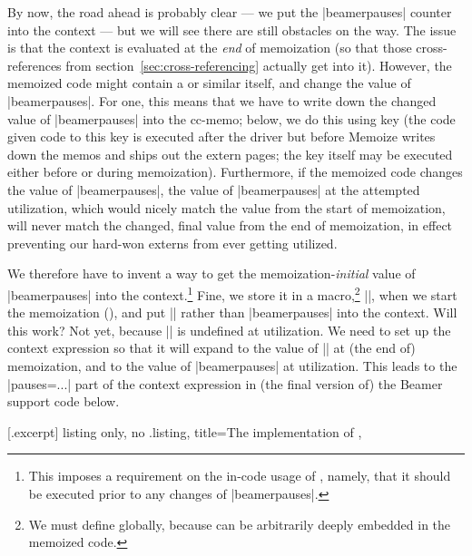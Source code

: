 \documentclass[a4paper,11pt]{article}
\begin{document}
By now, the road ahead is probably clear --- we put the |beamerpauses| counter
into the context --- but we will see there are still obstacles on the way.  The
issue is that the context is evaluated at the \emph{end} of memoization (so
that those cross-references from section~\ref{sec:cross-referencing} actually
get into it).  However, the memoized code might contain a  or similar
itself, and change the value of |beamerpauses|.  For one, this means that we
have to write down the changed value of |beamerpauses| into the cc-memo; below,
we do this using key  (the code given code to this
key is executed after the driver but before Memoize writes down the memos and
ships out the extern pages; the key itself may be executed either before or
during memoization).  Furthermore, if the memoized code changes the value of
|beamerpauses|, the value of |beamerpauses| at the attempted utilization, which
would nicely match the value from the start of memoization, will never match
the changed, final value from the end of memoization, in effect preventing our
hard-won externs from ever getting utilized.

We therefore have to invent a way to get the memoization-\emph{initial} value
of |beamerpauses| into the context.\footnote{This imposes a requirement on the
  in-code usage of , namely, that it should be executed
  prior to any changes of |beamerpauses|.}  Fine, we store it in a
macro,\footnote{We must define  globally, because
   can be arbitrarily deeply embedded in the memoized
  code.} |\mmzBeamerPauses|, when we start the memoization (), and put |\mmzBeamerPauses| rather than |beamerpauses| into the
context.  Will this work?  Not yet, because |\mmzBeamerPauses| is undefined at
utilization.  We need to set up the context expression so that it will expand
to the value of |\mmzBeamerPauses| at (the end of) memoization, and to the
value of |beamerpauses| at utilization.  This leads to the
|pauses=\ifmemoizing...| part of the context expression in (the final version
  of) the Beamer support code below.

\medskip %

[.excerpt]{%
  listing only, no .listing,
  title={The implementation of },
}
\end{document}
